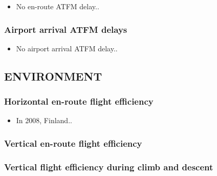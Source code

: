\documentclass[]{article}
\providecommand{\tightlist}{%
  \setlength{\itemsep}{0pt}\setlength{\parskip}{0pt}}
\begin{document}
\begin{itemize}
\tightlist
\item
  No en-route ATFM delay..
\end{itemize}

\hypertarget{airport-arrival-atfm-delays}{%
\subsubsection*{Airport arrival ATFM delays}\label{airport-arrival-atfm-delays}}

\begin{itemize}
\tightlist
\item
  No airport arrival ATFM delay..
\end{itemize}

\hypertarget{environment}{%
\subsection*{ENVIRONMENT}\label{environment}}

\hypertarget{horizontal-en-route-flight-efficiency}{%
\subsubsection*{Horizontal en-route flight efficiency}\label{horizontal-en-route-flight-efficiency}}

\begin{itemize}
\tightlist
\item
  In 2008, Finland..
\end{itemize}

\hypertarget{vertical-en-route-flight-efficiency}{%
\subsubsection*{Vertical en-route flight efficiency}\label{vertical-en-route-flight-efficiency}}

\hypertarget{vertical-flight-efficiency-during-climb-and-descent}{%
\subsubsection*{Vertical flight efficiency during climb and descent}\label{vertical-flight-efficiency-during-climb-and-descent}}
\end{document}
